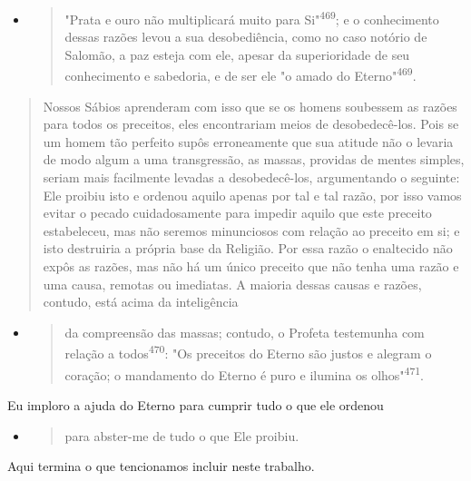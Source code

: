 \begin{itemize}
\item
  \begin{quote}
  "Prata e ouro não multiplicará muito para Si"\textsuperscript{469}; e
  o conhecimento dessas razões levou a sua desobediência, como no caso
  notório de Salomão, a paz es­teja com ele, apesar da superioridade de
  seu conhecimento e sabedoria, e de ser ele "o amado do
  Eterno"\textsuperscript{469}.
  \end{quote}
\end{itemize}

\begin{quote}
Nossos Sábios aprenderam com isso que se os homens soubessem as razões
para todos os preceitos, eles encontrariam meios de desobedecê-los. Pois
se um homem tão perfeito supôs erroneamente que sua atitude não o
leva­ria de modo algum a uma transgressão, as massas, providas de mentes
simples, seriam mais facilmente levadas a desobedecê-los, argumentando o
seguinte: Ele proibiu isto e ordenou aquilo apenas por tal e tal razão,
por isso vamos evitar o pecado cuidadosamente para impedir aquilo que
este preceito estabeleceu, mas não seremos minunciosos com relação ao
preceito em si; e isto destruiria a própria base da Religião. Por essa
razão o enaltecido não expôs as razões, mas não há um único preceito que
não tenha uma razão e uma causa, remotas ou imediatas. A maioria dessas
causas e razões, contudo, está acima da inteligência
\end{quote}

\begin{itemize}
\item
  \begin{quote}
  da compreensão das massas; contudo, o Profeta testemunha com relação a
  todos\textsuperscript{470}: "Os preceitos do Eterno são justos e
  alegram o coração; o manda­mento do Eterno é puro e ilumina os
  olhos"\textsuperscript{471}.
  \end{quote}
\end{itemize}

Eu imploro a ajuda do Eterno para cumprir tudo o que ele ordenou

\begin{itemize}
\item
  \begin{quote}
  para abster-me de tudo o que Ele proibiu.
  \end{quote}
\end{itemize}

Aqui termina o que tencionamos incluir neste trabalho.

